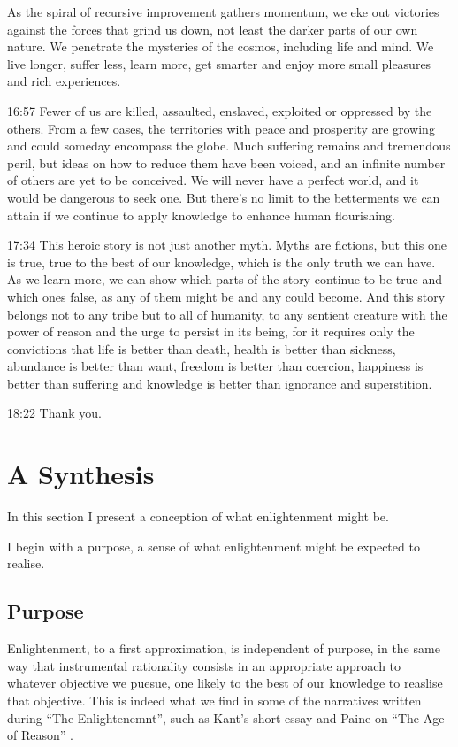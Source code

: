 \documentclass[10pt,titlepage]{article}
\begin{document}
As the spiral of recursive improvement
gathers momentum,
we eke out victories against the forces that grind us down,
not least the darker parts of our own nature.
We penetrate the mysteries of the cosmos, including life and mind.
We live longer, suffer less, learn more,
get smarter and enjoy more small pleasures
and rich experiences.

16:57
Fewer of us are killed, assaulted, enslaved, exploited
or oppressed by the others.
From a few oases, the territories with peace and prosperity are growing
and could someday encompass the globe.
Much suffering remains
and tremendous peril,
but ideas on how to reduce them have been voiced,
and an infinite number of others are yet to be conceived.
We will never have a perfect world,
and it would be dangerous to seek one.
But there's no limit to the betterments we can attain
if we continue to apply knowledge to enhance human flourishing.

17:34
This heroic story is not just another myth.
Myths are fictions, but this one is true,
true to the best of our knowledge, which is the only truth we can have.
As we learn more,
we can show which parts of the story continue to be true and which ones false,
as any of them might be and any could become.
And this story belongs not to any tribe
but to all of humanity,
to any sentient creature with the power of reason
and the urge to persist in its being,
for it requires only the convictions
that life is better than death,
health is better than sickness,
abundance is better than want,
freedom is better than coercion,
happiness is better than suffering
and knowledge is better than ignorance and superstition.

18:22
Thank you.


\section{A Synthesis}

In this section I present a conception of what enlightenment might be.

I begin with a purpose, a sense of what enlightenment might be expected to realise.

\subsection{Purpose}

Enlightenment, to a first approximation, is independent of purpose, in the same way that instrumental rationality consists in an appropriate approach to whatever objective we puesue, one likely to the best of our knowledge to reaslise that objective.
This is indeed what we find in some of the narratives written during ``The Enlightenemnt'', such as Kant's short essay \cite{kant-en} and Paine on ``The Age of Reason'' \cite{paine-reason}. 
\end{document}
